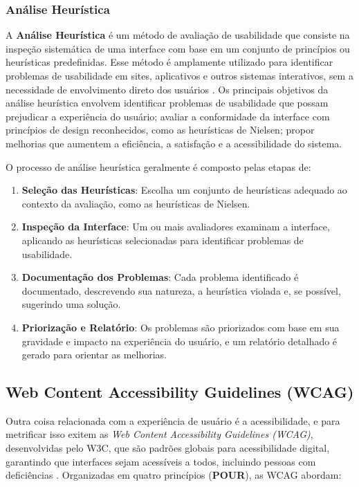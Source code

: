 {    \subsubsection{Análise Heurística}
    A \textbf{Análise Heurística} é um método de avaliação de usabilidade que consiste na inspeção sistemática de uma interface com base em um conjunto de princípios ou heurísticas predefinidas. Esse método é amplamente utilizado para identificar problemas de usabilidade em sites, aplicativos e outros sistemas interativos, sem a necessidade de envolvimento direto dos usuários \citep{Nielsen1994}.
    Os principais objetivos da análise heurística envolvem identificar problemas de usabilidade que possam prejudicar a experiência do usuário; avaliar a conformidade da interface com princípios de design reconhecidos, como as heurísticas de Nielsen; propor melhorias que aumentem a eficiência, a satisfação e a acessibilidade do sistema.
    
    O processo de análise heurística geralmente é composto pelas etapas de:
    
    \begin{enumerate}
        \item \textbf{Seleção das Heurísticas}: Escolha um conjunto de heurísticas adequado ao contexto da avaliação, como as heurísticas de Nielsen.
        
        \item \textbf{Inspeção da Interface}: Um ou mais avaliadores examinam a interface, aplicando as heurísticas selecionadas para identificar problemas de usabilidade.
        
        \item \textbf{Documentação dos Problemas}: Cada problema identificado é documentado, descrevendo sua natureza, a heurística violada e, se possível, sugerindo uma solução.
        
        \item \textbf{Priorização e Relatório}: Os problemas são priorizados com base em sua gravidade e impacto na experiência do usuário, e um relatório detalhado é gerado para orientar as melhorias.
    \end{enumerate}
    
    \subsection{Web Content Accessibility Guidelines (WCAG)}
    
    Outra coisa relacionada com a experiência de usuário é a acessibilidade, e para metrificar isso exitem as \textit{Web Content Accessibility Guidelines (WCAG)}, desenvolvidas pelo W3C, que são padrões globais para acessibilidade digital, garantindo que interfaces sejam acessíveis a todos, incluindo pessoas com deficiências \citep{wcag21}. Organizadas em quatro princípios (\textbf{POUR}), as WCAG abordam:
    
}

